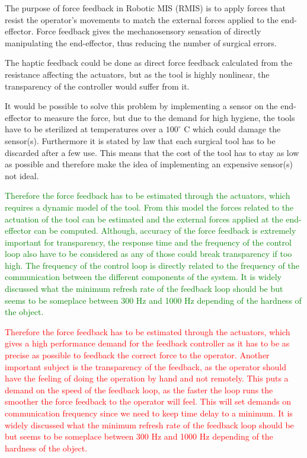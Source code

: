 {\color{red}
The purpose of force feedback in Robotic MIS (RMIS) is to apply forces that resist the operator’s movements to match the external forces applied to the end-effector.
Force feedback gives the mechanosensory sensation of directly manipulating the end-effector, thus reducing the number of surgical errors.


The haptic feedback could be done as direct force feedback calculated from the resistance affecting the actuators, but as the tool is highly nonlinear, the transparency of the controller would suffer from it.}  It would be possible to solve this problem by implementing a sensor on the end-effector to measure the force, but due to the demand for high hygiene, the tools have to be sterilized at temperatures over a $100^\circ$ C which could damage the sensor(s). Furthermore it is stated by law that each surgical tool has to be discarded after a few use. This means that the cost of the tool has to stay as low as possible and therefore make the idea of implementing an expensive sensor(s) not ideal.

\textcolor{green}{Therefore the force feedback has to be estimated through the actuators, which requires a dynamic model of the tool. From this model the forces related to the actuation of the tool can be estimated and the external forces applied at the end-effector can be computed. Although, accuracy of the force feedback is extremely important for transparency, the response time and the frequency of the control loop also have to be considered as any of those could break transparency if too high. The frequency of the control loop is directly related to the frequency of the communication between the different components of the system. It is widely discussed what the minimum refresh rate of the feedback loop should be but seems to be someplace between 300 Hz and 1000 Hz depending of the hardness of the object\cite{coles2011role}.}

\textcolor{red}{Therefore the force feedback has to be estimated through the actuators, which gives a high performance demand for the feedback controller as it has to be as precise as possible to feedback the correct force to the operator. Another important subject is the transparency of the feedback, as the operator should have the feeling of doing the operation by hand and not remotely. This puts a demand on the speed of the feedback loop, as the faster the loop runs the smoother the force feedback to the operator will feel. This will set demands on communication frequency since we need to keep time delay to a minimum. It is widely discussed what the minimum refresh rate of the feedback loop should be but seems to be someplace between 300 Hz and 1000 Hz depending of the hardness of the object\cite{coles2011role}.}

